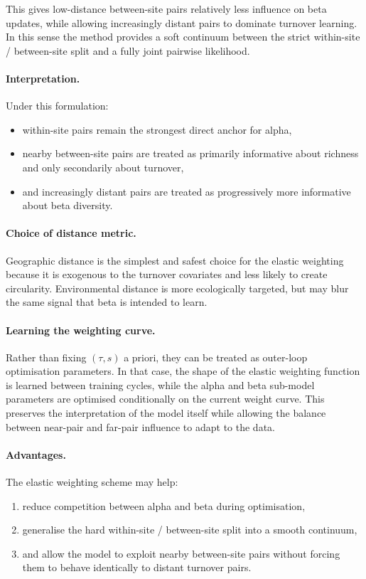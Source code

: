 \documentclass{article}
\begin{document}
This gives low-distance between-site pairs relatively less influence on beta updates, while allowing increasingly distant pairs to dominate turnover learning. In this sense the method provides a soft continuum between the strict within-site / between-site split and a fully joint pairwise likelihood.

\paragraph{Interpretation.}
Under this formulation:
\begin{itemize}
    \item within-site pairs remain the strongest direct anchor for alpha,
    \item nearby between-site pairs are treated as primarily informative about richness and only secondarily about turnover,
    \item and increasingly distant pairs are treated as progressively more informative about beta diversity.
\end{itemize}

\paragraph{Choice of distance metric.}
Geographic distance is the simplest and safest choice for the elastic weighting because it is exogenous to the turnover covariates and less likely to create circularity. Environmental distance is more ecologically targeted, but may blur the same signal that beta is intended to learn.

\paragraph{Learning the weighting curve.}
Rather than fixing \((\tau,s)\) a priori, they can be treated as outer-loop optimisation parameters. In that case, the shape of the elastic weighting function is learned between training cycles, while the alpha and beta sub-model parameters are optimised conditionally on the current weight curve. This preserves the interpretation of the model itself while allowing the balance between near-pair and far-pair influence to adapt to the data.

\paragraph{Advantages.}
The elastic weighting scheme may help:
\begin{enumerate}
    \item reduce competition between alpha and beta during optimisation,
    \item generalise the hard within-site / between-site split into a smooth continuum,
    \item and allow the model to exploit nearby between-site pairs without forcing them to behave identically to distant turnover pairs.
\end{enumerate}
\end{document}
